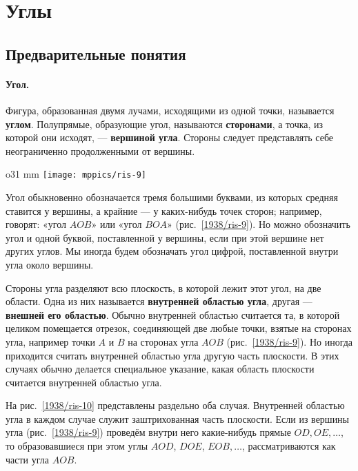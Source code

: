 
\section{Углы} 

\subsection*{Предварительные понятия}

\paragraph{Угол.}\label{1938/13}
Фигура, образованная двумя лучами, исходящими из одной точки, называется \textbf{углом}.
Полупрямые, образующие угол, называются \textbf{сторонами}, а точка, из которой они исходят, — \textbf{вершиной угла}.
Стороны следует представлять себе неограниченно продолженными от вершины.

\begin{wrapfigure}{o}{31 mm}
\centering
\texttt{[image: mppics/ris-9]}
\caption{}\label{1938/ris-9}
\end{wrapfigure}

Угол обыкновенно обозначается тремя большими буквами, из которых средняя ставится у вершины, а крайние — у каких-нибудь точек сторон;
например, говорят:
«угол $AOB$» или «угол $BOA$» (рис.~\ref{1938/ris-9}).
Но можно обозначить угол и одной буквой, поставленной у вершины, если при этой вершине нет других углов.
Мы иногда будем обозначать угол цифрой, поставленной внутри угла около вершины.

Стороны угла разделяют всю плоскость, в которой лежит этот угол, на две области.
Одна из них называется \textbf{внутренней областью угла}, другая — \textbf{внешней его областью}.
Обычно внутренней областью считается та, в которой целиком помещается отрезок, соединяющей две любые точки, взятые на сторонах угла, например точки $A$ и $B$ на сторонах угла $AOB$ (рис.~\ref{1938/ris-9}).
Но иногда приходится считать внутренней областью угла другую часть плоскости.
В этих случаях обычно делается специальное указание, какая область плоскости считается внутренней областью угла.

На рис.~\ref{1938/ris-10} представлены раздельно оба случая.
Внутренней областью угла в каждом случае служит заштрихованная часть плоскости.
Если из вершины угла (рис.~\ref{1938/ris-9}) проведём внутри него какие-нибудь прямые $OD, OE,\dots$, то образовавшиеся при этом углы $AOD$, $DOE$, $EOB,\dots$, рассматриваются как части угла $AOB$.

